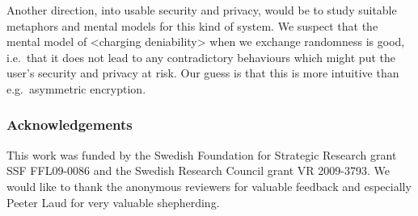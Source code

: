 Another direction, into usable security and privacy, would be to study suitable 
metaphors and mental models for this kind of system.
We suspect that the mental model of <charging deniability> when we exchange 
randomness is good, i.e.~that it does not lead to any contradictory behaviours 
which might put the user's security and privacy at risk.
Our guess is that this is more intuitive than e.g.~asymmetric encryption.


\subsubsection*{Acknowledgements}

This work was funded by the Swedish Foundation for Strategic Research grant SSF 
FFL09-0086 and the Swedish Research Council grant VR 2009-3793.
We would like to thank the anonymous reviewers for valuable feedback and 
especially Peeter Laud for very valuable shepherding.

